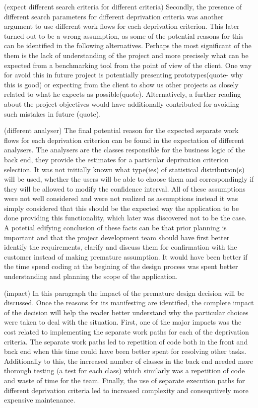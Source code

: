 \documentclass{l3proj}
\begin{document}
(expect different search criteria for different criteria)
Secondly, the presence of different search parameters for different deprivation criteria was another argument to use different work flows for each deprivation criterion. This later turned out to be a wrong assumption, as some of the potential reasons for this can be identified in the following alternatives. Perhaps the most significant of the them is the lack of understanding of the project and more precisely what can be expected from a benchmarking tool from the point of view of the client. One way for avoid this in future project is potentially presenting prototypes(quote- why this is good) or expecting from the client to show us other projects as closely related to what he expects as possible(quote). Alternatively, a further reading about the project objectives would have additionally contributed for avoiding such mistakes in future (quote).

(different analyser)
The final potential reason for the expected separate work flows for each deprivation criterion can be found in the expectation of different analysers. The analysers are the classes responsible for the business logic of the back end, they provide the estimates for a particular deprivation criterion selection. It was not initially known what type(ies) of statistical distribution(s) will be used, whether the users will be able to choose them and correspondingly if they will be allowed to modify the confidence interval.  All of these assumptions were not well considered and were not realized as assumptions instead it was simply considered that this should be the expected way the application to be done providing this functionality, which later was discovered not to be the case. A potetial edifying conclusion of these facts can be that prior planning is important and that the project development team should have first better identify the requirements, clarify and discuss them for confirmation with the customer instead of making premature assumption. It would have been better if the time spend coding at the begining of the design process was spent better understanding and planning the scope of the application.

(impact)
In this paragraph the impact of the premature design decision will be discussed. Once the reasons for its manifesting are identified, the complete impact of the decision will help the reader better understand why the particular choices were taken to deal with the situation. First, one of the major impacts was the cost related to implementing the separate work paths for each of the deprivation criteria. The separate work paths led to repetition of code both in the front and back end when this time could have been better spent for resolving other tasks. Additionally to this, the increased number of classes in the back end needed more thorough testing (a test for each class) which similarly was a repetition of code and waste of time for the team. Finally, the use of separate execution paths for different deprivation criteria led to increased complexity and consequtively more expensive maintenance.
\end{document}
